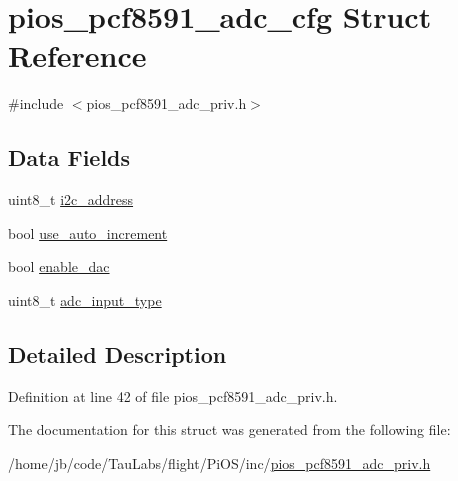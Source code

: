\hypertarget{structpios__pcf8591__adc__cfg}{\section{pios\-\_\-pcf8591\-\_\-adc\-\_\-cfg \-Struct \-Reference}
\label{structpios__pcf8591__adc__cfg}
}


{\ttfamily \#include $<$pios\-\_\-pcf8591\-\_\-adc\-\_\-priv.\-h$>$}

\subsection*{\-Data \-Fields}
\begin{DoxyCompactItemize}
\item 
uint8\-\_\-t \hyperlink{group___p_i_o_s___p_c_f8591___a_d_c_gae67d73ed1272f02fb5f31eb18a31d9b8}{i2c\-\_\-address}
\item 
bool \hyperlink{group___p_i_o_s___p_c_f8591___a_d_c_ga20ee95c4cade76e7ad834f18e30d4123}{use\-\_\-auto\-\_\-increment}
\item 
bool \hyperlink{group___p_i_o_s___p_c_f8591___a_d_c_gad7d1cb320c59f88ea6cf49c65282ba19}{enable\-\_\-dac}
\item 
uint8\-\_\-t \hyperlink{group___p_i_o_s___p_c_f8591___a_d_c_ga4c8aacdc272129b5e9d614a47a93cd06}{adc\-\_\-input\-\_\-type}
\end{DoxyCompactItemize}


\subsection{\-Detailed \-Description}


\-Definition at line 42 of file pios\-\_\-pcf8591\-\_\-adc\-\_\-priv.\-h.



\-The documentation for this struct was generated from the following file\-:\begin{DoxyCompactItemize}
\item 
/home/jb/code/\-Tau\-Labs/flight/\-Pi\-O\-S/inc/\hyperlink{pios__pcf8591__adc__priv_8h}{pios\-\_\-pcf8591\-\_\-adc\-\_\-priv.\-h}\end{DoxyCompactItemize}
